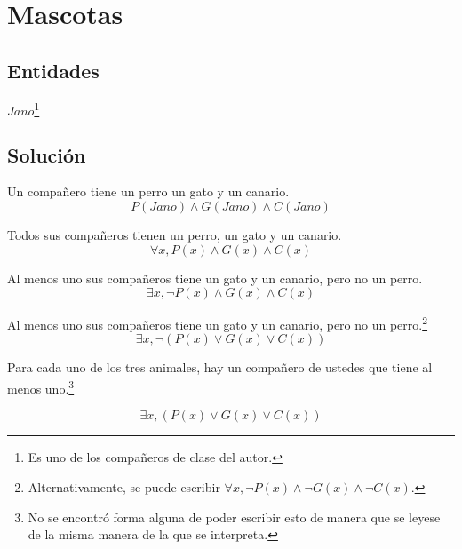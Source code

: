 \section{Mascotas}

\subsection{Entidades}
$Jano$\footnote{Es uno de los compañeros de clase del autor.}

\subsection{Solución}

Un compañero tiene un perro un gato y un canario.
\begin{equation}
P(Jano) \wedge G(Jano) \wedge C(Jano)
\end{equation}

Todos sus compañeros tienen un perro, un gato y un canario.
\begin{equation}
\forall x,  P(x) \wedge G(x) \wedge C(x)
\end{equation}

Al menos uno sus compañeros tiene un gato y un canario, pero no un perro.
\begin{equation}
\exists x,  \neg P(x) \wedge G(x) \wedge C(x)
\end{equation}

Al menos uno sus compañeros tiene un gato y un canario, pero no un perro.\footnote{Alternativamente, se puede escribir $\forall x,   \neg P(x) \wedge \neg G(x) \wedge \neg C(x)$.}
\begin{equation}
\exists x,  \neg (P(x) \vee G(x) \vee C(x))
\end{equation}

Para cada uno de los tres animales, hay un compañero de ustedes que tiene al menos uno.\footnote{No se encontró forma alguna de poder escribir esto de manera que se leyese de la misma manera de la que se interpreta.}

\begin{equation}
\exists x,  (P(x) \vee G(x) \vee C(x))
\end{equation}
